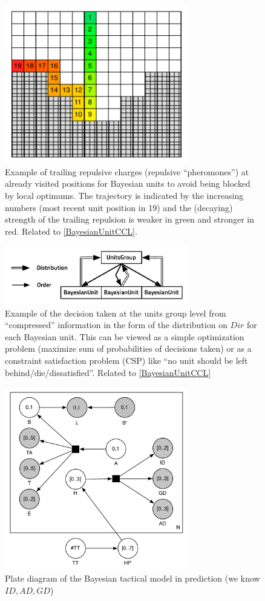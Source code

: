 \begin{figure}[ht]
\begin{center}
\includegraphics[width=8cm]{images/trailing_pheromones.pdf}
\caption{Example of trailing repulsive charges (repulsive ``pheromones'') at already visited positions for Bayesian units to avoid being blocked by local optimums. The trajectory is indicated by the increasing numbers (most recent unit position in 19) and the (decaying) strength of the trailing repulsion is weaker in green and stronger in red. Related to \ref{BayesianUnitCCL}.}
\label{fig:BayesianTrailingPheromone}
\end{center}
\end{figure}

\begin{figure}[ht]
\begin{center}
\includegraphics[width=8cm]{images/UnitsGroup_BayesianUnits.pdf}
\caption{Example of the decision taken at the units group level from ``compressed'' information in the form of the distribution on $Dir$ for each Bayesian unit. This can be viewed as a simple optimization problem (maximize sum of probabilities of decisions taken) or as a constraint satisfaction problem (CSP) like ``no unit should be left behind/die/dissatisfied''. Related to \ref{BayesianUnitCCL}}
\label{fig:BayesianUnitsGroup}
\end{center}
\end{figure}


\begin{figure}[ht]
\begin{center}
\includegraphics[width=8cm]{images/SpecialTactics_plate.pdf}
\caption{Plate diagram of the Bayesian tactical model in prediction (we know $ID, AD, GD$)}
\label{fig:SpecialTactics_plate}
\end{center}
\end{figure}

